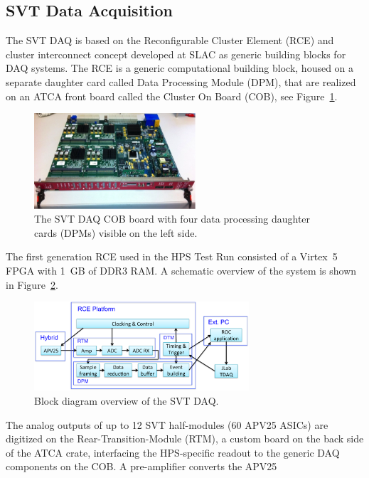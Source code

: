 \documentclass[final,3p,times,twocolumn]{elsarticle}
\begin{document}
\subsection{SVT Data Acquisition}
\label{sec:svt_daq}
The SVT DAQ is based on the Reconfigurable Cluster Element (RCE) and cluster 
interconnect concept developed at SLAC as generic building blocks for DAQ systems. 
The RCE is a generic computational building block, housed on a separate daughter card called 
Data Processing Module (DPM), that are realized on an ATCA front board called the Cluster On Board 
(COB), see Figure~\ref{fig:cob}.
 \begin{figure}[]
\begin{center}
{\small
	\includegraphics[width=6cm]{figures/svt_daq_module}
	\caption{The SVT DAQ COB board with four data processing daughter cards (DPMs) visible on the left side.}
	\label{fig:cob}
}
\end{center}
\end{figure}
The first generation RCE used in the HPS Test Run consisted of a Virtex~5 FPGA with 1~GB of DDR3 RAM. 
A schematic overview of the system is shown in Figure~\ref{fig:svtdaq}. 
 \begin{figure}[]
\begin{center}
{\small
	\includegraphics[width=8cm]{figures/svt-daq-sketch}
	\caption{Block diagram overview of the SVT DAQ.}
	\label{fig:svtdaq}
}
\end{center}
\end{figure}
The analog outputs of up to 12 SVT half-modules (60 APV25 ASICs) are digitized on the 
Rear-Transition-Module (RTM), a custom board on the back side of the ATCA crate, interfacing the 
HPS-specific readout to the generic DAQ components on the COB. A pre-amplifier converts the APV25 
\end{document}
